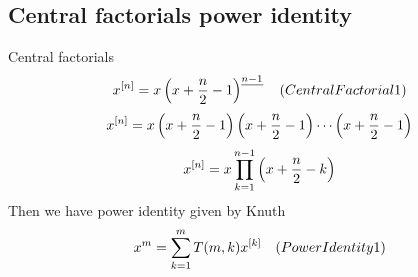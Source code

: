 \subsection{Central factorials power identity}\label{subsec:central-factorials-power-identity}
Central factorials
\begin{equation*}
    x^{[n]} = x \left(x+\frac{n}{2}-1 \right)^{\underline{n-1}} \quad
    (CentralFactorial1)
\end{equation*}
\begin{equation*}
    x^{[n]} = x \left( x+\frac{n}{2}-1 \right) \left( x+\frac{n}{2}-1 \right) \cdots \left (x+\frac{n}{2}-1 \right)
\end{equation*}
\begin{equation*}
    x^{[n]} = x \prod_{k=1}^{n-1} \left( x+\frac{n}{2}-k \right)
\end{equation*}
Then we have power identity given by Knuth
\begin{equation*}
    x^m = \sum_{k=1}^{m} T(m, k) x^{[k]} \quad
    (PowerIdentity1)
\end{equation*}